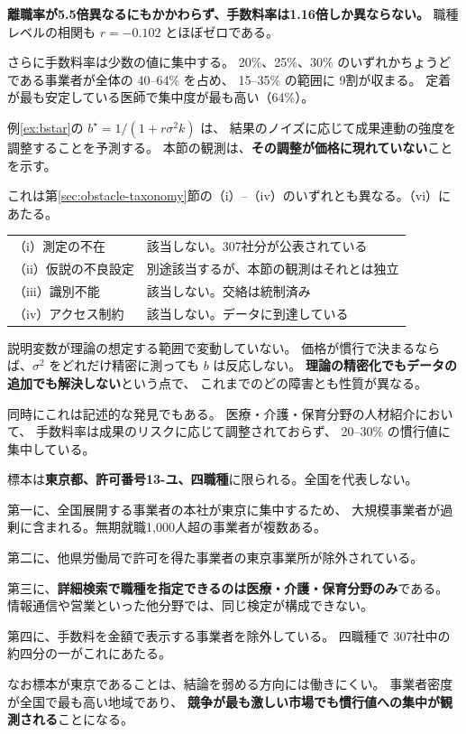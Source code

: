 \textbf{離職率が5.5倍異なるにもかかわらず、手数料率は1.16倍しか異ならない。}
職種レベルの相関も $r=-0.102$ とほぼゼロである。

さらに手数料率は少数の値に集中する。
20\%、25\%、30\% のいずれかちょうどである事業者が全体の 40--64\% を占め、
15--35\% の範囲に 9割が収まる。
定着が最も安定している医師で集中度が最も高い（64\%）。

\begin{remark}[理論が想定する調整が作動していない]
\label{rem:no-adjustment}
例\ref{ex:bstar}の $b^\star=1/(1+r\sigma^2 k)$ は、
結果のノイズに応じて成果連動の強度を調整することを予測する。
本節の観測は、\textbf{その調整が価格に現れていない}ことを示す。

これは第\ref{sec:obstacle-taxonomy}節の（i）--（iv）のいずれとも異なる。（vi）にあたる。

\begin{center}
\begin{tabularx}{\textwidth}{@{}lX@{}}
\toprule
（i）測定の不在 & 該当しない。307社分が公表されている \\
（ii）仮説の不良設定 & 別途該当するが、本節の観測はそれとは独立 \\
（iii）識別不能 & 該当しない。交絡は統制済み \\
（iv）アクセス制約 & 該当しない。データに到達している \\
\bottomrule
\end{tabularx}
\label{tab:predX-taxonomy-check}
\end{center}

説明変数が理論の想定する範囲で変動していない。
価格が慣行で決まるならば、$\sigma^2$ をどれだけ精密に測っても $b$ は反応しない。
\textbf{理論の精密化でもデータの追加でも解決しない}という点で、
これまでのどの障害とも性質が異なる。

同時にこれは記述的な発見でもある。
医療・介護・保育分野の人材紹介において、
手数料率は成果のリスクに応じて調整されておらず、
20--30\% の慣行値に集中している。
\end{remark}

\begin{remark}[本節の標本の限界]
\label{rem:predX-scope}
標本は\textbf{東京都、許可番号13-ユ、四職種}に限られる。全国を代表しない。

第一に、全国展開する事業者の本社が東京に集中するため、
大規模事業者が過剰に含まれる。無期就職1,000人超の事業者が複数ある。

第二に、他県労働局で許可を得た事業者の東京事業所が除外されている。

第三に、\textbf{詳細検索で職種を指定できるのは医療・介護・保育分野のみ}である。
情報通信や営業といった他分野では、同じ検定が構成できない。

第四に、手数料を金額で表示する事業者を除外している。
四職種で 307社中の約四分の一がこれにあたる。

なお標本が東京であることは、結論を弱める方向には働きにくい。
事業者密度が全国で最も高い地域であり、
\textbf{競争が最も激しい市場でも慣行値への集中が観測される}ことになる。
\end{remark}

